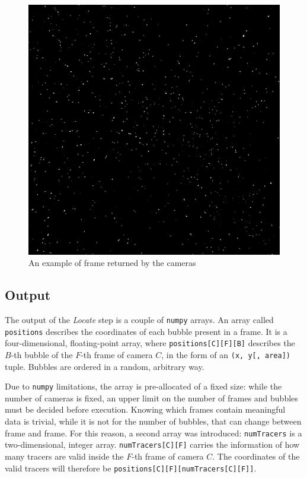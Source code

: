 \begin{figure}
	\centerline{\includegraphics[width=\locateimgsize]{images/locate/_original-frame-full.png}}
	\caption{\centering An example of frame returned by the cameras}
	\label{fig:locate:original}
\end{figure}

\subsection{Output}

The output of the \textit{Locate} step is a couple of \texttt{numpy} arrays.
An array called \texttt{positions} describes the coordinates of each bubble present in a frame. It is a four-dimensional, floating-point array, where \texttt{positions[C][F][B]} describes the $B$-th bubble of the $F$-th frame of camera $C$, in the form of an \texttt{(x, y[, area])} tuple.
Bubbles are ordered in a random, arbitrary way.

Due to \texttt{numpy} limitations, the array is pre-allocated of a fixed size: while the number of cameras is fixed, an upper limit on the number of frames and bubbles must be decided before execution.
Knowing which frames contain meaningful data is trivial, while it is not for the number of bubbles, that can change between frame and frame.
For this reason, a second array was introduced: \texttt{numTracers} is a two-dimensional, integer array.
\texttt{numTracers[C][F]} carries the information of how many tracers are valid inside the $F$-th frame of camera $C$.
The coordinates of the valid tracers will therefore be \texttt{positions[C][F][numTracers[C][F]]}.

